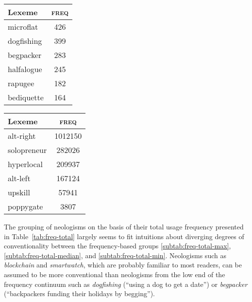 \documentclass[
  a4paper,
  abstract=on,
  captions=tableabove,
  ]{scrartcl}
\newcommand{\ol}[1]{\emph{#1}}
\begin{document}
\begin{table}
        \begin{subtable}{.4\linewidth}
          \label{subtab:freq-total-min}
          \centering
          \begin{tabular}{l S[table-format=3]}
            \toprule
            Lexeme     & {\textsc{freq}} \\
            \midrule
            microflat  & 426             \\
            dogfishing & 399             \\
            begpacker  & 283             \\
            halfalogue & 245             \\
            rapugee    & 182             \\
            bediquette & 164             \\
            \bottomrule
          \end{tabular}
        \end{subtable}
        \begin{subtable}{.4\linewidth}
          \label{subtab:freq-total-cases}
          \centering
          \begin{tabular}{l S[table-format=7]}
            \toprule
            Lexeme       & {\textsc{freq}}  \\
            \midrule
            alt-right    & 1012150 \\
            solopreneur  & 282026  \\
            hyperlocal   & 209937  \\
            alt-left     & 167124  \\
            upskill      & 57941   \\
            poppygate    & 3807    \\
            \bottomrule
          \end{tabular}
        \end{subtable}
      \end{table}

      The grouping of neologisms on the basis of their total usage frequency presented in Table~\ref{tab:freq-total} largely seems to fit intuitions about diverging degrees of conventionality between the frequency-based groups \ref{subtab:freq-total-max}, \ref{subtab:freq-total-median}, and \ref{subtab:freq-total-min}. Neologisms such as \ol{blockchain} and \ol{smartwatch}, which are probably familiar to most readers, can be assumed to be more conventional than neologisms from the low end of the frequency continuum such as \ol{dogfishing} (\enquote{using a dog to get a date}) or \ol{begpacker} (\enquote{backpackers funding their holidays by begging}).
\end{document}
